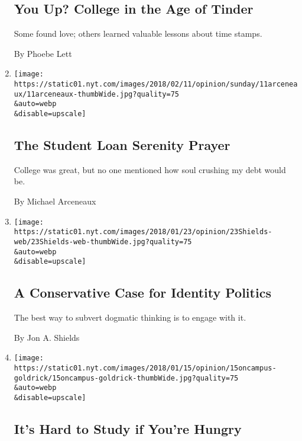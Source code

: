 \begin{enumerate}
  \hypertarget{you-up-college-in-the-age-of-tinder}{%
  \subsection{You Up? College in the Age of
  Tinder}\label{you-up-college-in-the-age-of-tinder}}

  Some found love; others learned valuable lessons about time stamps.

  By Phoebe Lett
\item
  \href{/2018/02/10/opinion/sunday/student-loans-survive-emotions.html}{}

  \texttt{[image: https://static01.nyt.com/images/2018/02/11/opinion/sunday/11arceneaux/11arceneaux-thumbWide.jpg?quality=75\\\&auto=webp\\\&disable=upscale]}

  \hypertarget{the-student-loan-serenity-prayer}{%
  \subsection{The Student Loan Serenity
  Prayer}\label{the-student-loan-serenity-prayer}}

  College was great, but no one mentioned how soul crushing my debt
  would be.

  By Michael Arceneaux
\item
  \href{/2018/01/23/opinion/conservative-identity-politics.html}{}

  \texttt{[image: https://static01.nyt.com/images/2018/01/23/opinion/23Shields-web/23Shields-web-thumbWide.jpg?quality=75\\\&auto=webp\\\&disable=upscale]}

  \hypertarget{a-conservative-case-for-identity-politics}{%
  \subsection{A Conservative Case for Identity
  Politics}\label{a-conservative-case-for-identity-politics}}

  The best way to subvert dogmatic thinking is to engage with it.

  By Jon A. Shields
\item
  \href{/2018/01/14/opinion/hunger-college-food-insecurity.html}{}

  \texttt{[image: https://static01.nyt.com/images/2018/01/15/opinion/15oncampus-goldrick/15oncampus-goldrick-thumbWide.jpg?quality=75\\\&auto=webp\\\&disable=upscale]}

  \hypertarget{its-hard-to-study-if-youre-hungry}{%
  \subsection{It's Hard to Study if You're
  Hungry}\label{its-hard-to-study-if-youre-hungry}}


\end{enumerate}

